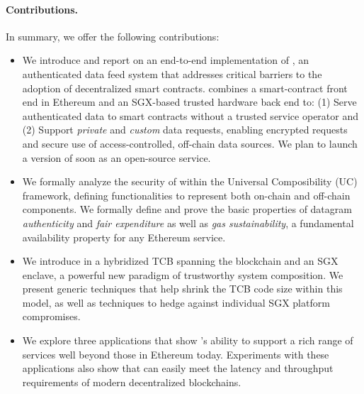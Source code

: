 \paragraph{\bf Contributions.}
In summary, we offer the following contributions:
\begin{itemize}[leftmargin=5mm]
\item
  \setlength{\itemsep}{2pt}
  \setlength{\parskip}{0pt}
  \setlength{\parsep}{0pt}
We introduce and report on an end-to-end implementation of \tcs, an authenticated data feed system that addresses critical barriers to the adoption of decentralized smart contracts. \tc combines a smart-contract front end in Ethereum and an SGX-based trusted hardware back end to: (1) Serve authenticated data to smart contracts without a trusted service operator and (2) Support {\em private} and {\em custom} data requests, enabling encrypted requests and secure use of access-controlled, off-chain data sources. We plan to launch a version of \tc soon as an open-source service.
\item We formally analyze the security of \tc within the Universal Composibility (UC) framework, defining functionalities to represent both on-chain and off-chain components. We formally define and prove the basic properties of datagram {\em authenticity} and {\em fair expenditure} as well as {\em gas sustainability}, a fundamental availability property for any Ethereum service. 
\item We introduce in \tc a hybridized TCB spanning the blockchain and an SGX enclave, a powerful new paradigm of trustworthy system composition. We present generic techniques that help shrink the TCB code size within this model, as well as techniques to hedge against individual SGX platform compromises. 
\item We explore three \tc applications that show \tc's ability to support a rich range of services well beyond those in Ethereum today. Experiments with these applications also show that \tc can easily meet the latency and throughput requirements of modern decentralized blockchains. 

\end{itemize}





